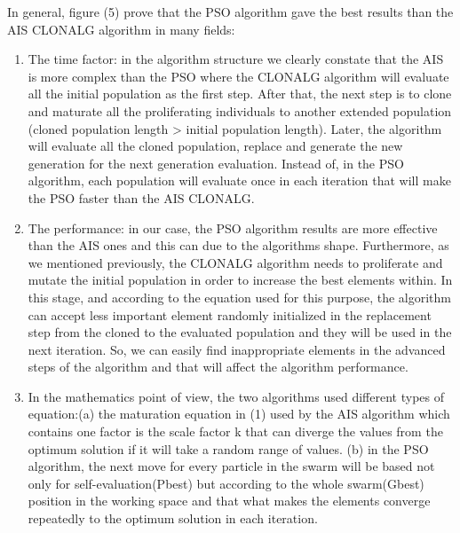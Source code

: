 \documentclass[]{interact}
\theoremstyle{plain}%
\theoremstyle{definition}
\theoremstyle{remark}
\begin{document}
\par
In general, figure (5) prove that the PSO algorithm gave the best results than the AIS CLONALG algorithm in many fields: 
\\
\begin{enumerate}
\item The time factor: in the algorithm structure we clearly constate that the AIS is more complex than the PSO where the CLONALG algorithm will evaluate all the initial population as the first step. After that, the next step is to clone and maturate all the proliferating individuals to another extended population (cloned population length > initial population length). Later, the algorithm will evaluate all the cloned population, replace and generate the new generation for the next generation evaluation. Instead of, in the PSO algorithm, each population will evaluate once in each iteration that will make the PSO faster than the AIS CLONALG. \\ 

\item The performance: in our case, the PSO algorithm results are more effective than the AIS ones and this can due to the algorithms shape. Furthermore, as we mentioned previously, the CLONALG algorithm needs to proliferate and mutate the initial population in order to increase the best elements within. In this stage, and according to the equation used for this purpose, the algorithm can accept less important element randomly initialized in the replacement step from the cloned to the evaluated population and they will be used in the next iteration. So, we can easily find inappropriate elements in the advanced steps of the algorithm and that will affect the algorithm performance. \\

\item In the mathematics point of view, the two algorithms used different types of equation:(a) the maturation equation in (1) used by the AIS algorithm which contains one factor is the scale factor k that can diverge the values from the optimum solution if it will take a random range of values. (b) in the PSO algorithm, the next move for every particle in the swarm will be based not only for self-evaluation(Pbest) but according to the whole swarm(Gbest) position in the working space and that what makes the elements converge repeatedly to the optimum solution in each iteration.
\end{enumerate}
\end{document}
